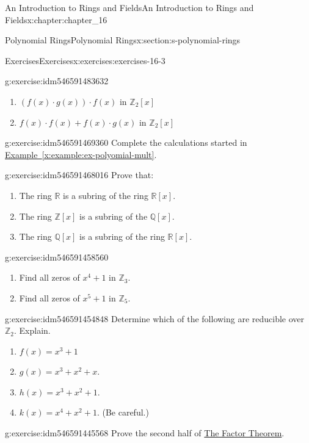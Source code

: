 \documentclass[oneside,10pt,]{book}
\newcommand{\xreffont}{\relax}
\numberwithin{equation}{section}
\begin{document}
\begin{chapterptx}{An Introduction to Rings and Fields}{}{An Introduction to Rings and Fields}{}{}{x:chapter:chapter_16}
\begin{sectionptx}{Polynomial Rings}{}{Polynomial Rings}{}{}{x:section:s-polynomial-rings}
\begin{exercises-subsection}{Exercises}{}{Exercises}{}{}{x:exercises:exercises-16-3}
\begin{divisionexercise}{1}{}{}{g:exercise:idm546591483632}
\begin{enumerate}[label=(\alph*)]
\item{}\((f(x) \cdot g(x)) \cdot f(x)\) in \(\mathbb{Z}_2[x]\)%
\item{}\(f(x) \cdot  f(x) + f(x)\cdot  g(x)\) in \(\mathbb{Z}_2[x]\)%
\end{enumerate}
%
\end{divisionexercise}%
\begin{divisionexercise}{2}{}{}{g:exercise:idm546591469360}%
Complete the calculations started in \hyperref[x:example:ex-polyomial-mult]{Example~{\xreffont\ref{x:example:ex-polyomial-mult}}}.%
\end{divisionexercise}%
\begin{divisionexercise}{3}{}{}{g:exercise:idm546591468016}%
Prove that:%
\begin{enumerate}[label=(\alph*)]
\item{}The ring \(\mathbb{R}\) is a subring of the ring \(\mathbb{R}[x]\).%
\item{}The ring \(\mathbb{Z}[x]\) is a subring of the \(\mathbb{Q}[x]\).%
\item{}The ring \(\mathbb{Q}[x]\) is a subring of the ring \(\mathbb{R}[x]\).%
\end{enumerate}
%
\end{divisionexercise}%
\begin{divisionexercise}{4}{}{}{g:exercise:idm546591458560}%
%
\begin{enumerate}[label=(\alph*)]
\item{}Find all zeros of \(x^4+ 1\) in \(\mathbb{Z}_3\).%
\item{}Find all zeros of \(x^5 + 1\) in \(\mathbb{Z}_5\).%
\end{enumerate}
%
\end{divisionexercise}%
\begin{divisionexercise}{5}{}{}{g:exercise:idm546591454848}%
Determine which of the following are reducible over \(\mathbb{Z}_2\). Explain.%
\begin{enumerate}[label=(\alph*)]
\item{}\(f(x) = x^3 + 1\)%
\item{}\(g(x) = x^3 + x^2 + x\).%
\item{}\(h(x) = x^3+ x^2 + 1\).%
\item{}\(k(x) = x^4 +x^2+ 1\). (Be careful.)%
\end{enumerate}
%
\end{divisionexercise}%
\begin{divisionexercise}{6}{}{}{g:exercise:idm546591445568}%
Prove the second half of \hyperref[x:theorem:theorem-polynomial-factor]{The Factor Theorem}.%

\end{divisionexercise}
\end{exercises-subsection}
\end{sectionptx}
\end{chapterptx}
\end{document}
